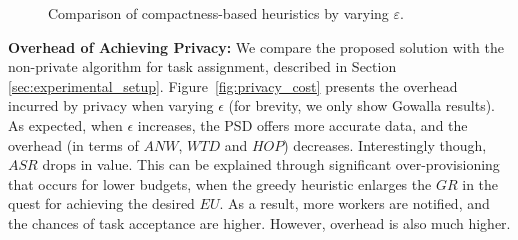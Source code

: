 \documentclass{USC-Thesis}
\numberwithin{equation}{chapter}
\begin{document}
\begin{figure*}[!ht]
\begin{comment}
	\begin{minipage}[b]{0.195\linewidth}
	\centering
		\texttt{[image: exps/ye\_zi\_2\_cmp]}
		\subcaption{$\mathit{CMP}$, Ye.-Zipf}
		\label{fig:ye_zi_2_cmp}
	\end{minipage}
	\begin{minipage}[b]{0.195\linewidth}
	\centering
		\texttt{[image: exps/ye\_zi\_2\_hop]}
		\subcaption{$\mathit{HOP}$, Ye.-Zipf}
		\label{fig:ye_zi_2_hop}
	\end{minipage}
	\begin{minipage}[b]{0.195\linewidth}
	\centering
		\texttt{[image: exps/ye\_zi\_2\_anw]}
		\subcaption{$\mathit{ANW}$, Ye.-Zipf}
		\label{fig:ye_zi_2_anw}
	\end{minipage}
	\begin{minipage}[b]{0.195\linewidth}
		\centering
		\texttt{[image: exps/ye\_zi\_2\_atd1]}
		\subcaption{$\mathit{WTD1}$, Ye.-Zipf}
		\label{fig:ye_zi_2_atd1}
	\end{minipage}
	\begin{minipage}[b]{0.195\linewidth}
	\centering
		\texttt{[image: exps/ye\_zi\_2\_atd2]}
		\subcaption{$\mathit{WTD2}$, Ye.-Zipf}
		\label{fig:ye_zi_2_atd2}
	\end{minipage}
\end{comment}	
	\caption{Comparison of compactness-based heuristics by varying $\varepsilon$.}
\label{fig:compactness_heuristic}
\end{figure*}

\textbf{Overhead of Achieving Privacy:}
We compare the proposed solution with the non-private algorithm for task assignment, described in Section \ref{sec:experimental_setup}. Figure~\ref{fig:privacy_cost} presents the overhead incurred by privacy when varying $\epsilon$ (for brevity, we only show Gowalla results). As expected, when $\epsilon$ increases, the PSD offers more accurate data, and the overhead (in terms of $\mathit{ANW}$, $\mathit{WTD}$ and $\mathit{HOP}$) decreases.
Interestingly though, $\mathit{ASR}$ drops in value. This can be explained through significant over-provisioning that occurs for lower budgets, when the greedy heuristic enlarges the $\mathit{GR}$ in the quest for achieving the desired $\mathit{EU}$. As a result, more workers are notified, and the chances of task acceptance are higher. However, overhead is also much higher.
\end{document}
